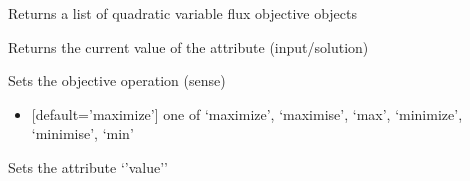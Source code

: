\documentclass[letterpaper,10pt,english]{sphinxmanual}
\begin{document}
\begin{fulllineitems}
\begin{fulllineitems}
\end{fulllineitems}


\begin{fulllineitems}
\label{\detokenize{modules_doc:cbmpy.CBModel.Objective.getQuadraticFluxObjectives}}
\pysigstartsignatures
{}
\pysigstopsignatures
\sphinxAtStartPar
Returns a list of quadratic variable flux objective objects

\end{fulllineitems}


\begin{fulllineitems}
\label{\detokenize{modules_doc:cbmpy.CBModel.Objective.getValue}}
\pysigstartsignatures
{}
\pysigstopsignatures
\sphinxAtStartPar
Returns the current value of the attribute (input/solution)

\end{fulllineitems}


\begin{fulllineitems}
\label{\detokenize{modules_doc:cbmpy.CBModel.Objective.setOperation}}
\pysigstartsignatures
{}
\pysigstopsignatures
\sphinxAtStartPar
Sets the objective operation (sense)
\begin{itemize}
\item {} 
\sphinxAtStartPar
{} {[}default=’maximize’{]} one of ‘maximize’, ‘maximise’, ‘max’, ‘minimize’, ‘minimise’, ‘min’

\end{itemize}

\end{fulllineitems}


\begin{fulllineitems}
\label{\detokenize{modules_doc:cbmpy.CBModel.Objective.setValue}}
\pysigstartsignatures
{}
\pysigstopsignatures
\sphinxAtStartPar
Sets the attribute ‘’value’’

\end{fulllineitems}


\end{fulllineitems}
\end{document}
